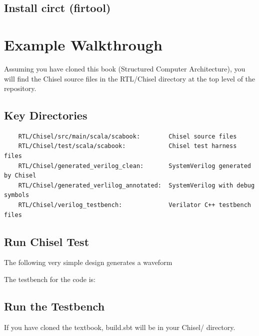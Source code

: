 \subsection{Install circt (firtool)}

\section{Example Walkthrough}
Assuming you have cloned this book (Structured Computer Architecture), you will find the Chisel source files in the RTL/Chisel directory at the top level of the repository.

\subsection{Key Directories}
\begin{verbatim}
    RTL/Chisel/src/main/scala/scabook:        Chisel source files
    RTL/Chisel/test/scala/scabook:            Chisel test harness files
    RTL/Chisel/generated_verilog_clean:       SystemVerilog generated by Chisel 
    RTL/Chisel/generated_verlilog_annotated:  SystemVerilog with debug symbols
    RTL/Chisel/verilog_testbench:             Verilator C++ testbench files
\end{verbatim}

\subsection{Run Chisel Test}
The following very simple design generates a waveform

The testbench for the code is:

\subsection{Run the Testbench}
If you have cloned the textbook, build.sbt will be in your Chisel/ directory.

